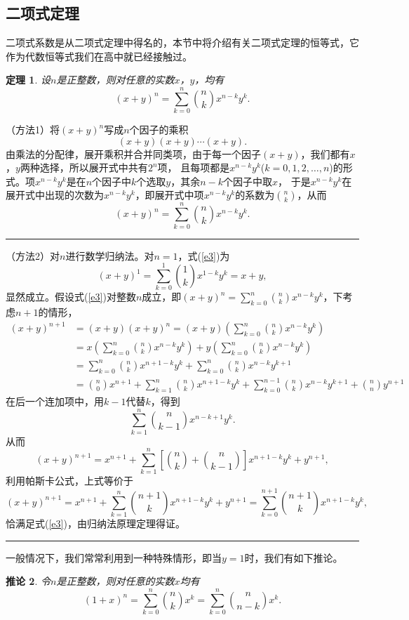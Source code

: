 \documentclass[a4paper,11pt,twoside]{book}
\newtheorem{thm}{定理}[section]
\newtheorem{coro}[thm]{推论}
\def\qed{\nopagebreak\hfill{\rule{4pt}{7pt}}\medbreak}
\begin{document}
\subsection{二项式定理}
二项式系数是从二项式定理中得名的，本节中将介绍有关二项式定理的恒等式，它作为代数恒等式我们在高中就已经接触过。
\begin{thm}
设$n$是正整数，则对任意的实数$x$，$y$，均有
\begin{equation}\label{e3}
(x+y)^n=\sum_{k=0}^n{n\choose k}x^{n-k}y^k.
\end{equation}
\end{thm}
（方法1）将$(x+y)^n$写成$n$个因子的乘积$$(x+y)(x+y)\cdots(x+y).$$
由乘法的分配律，展开乘积并合并同类项，由于每一个因子$(x+y)$，我们都有$x$，$y$两种选择，所以展开式中共有$2^n$项，
且每项都是$x^{n-k}y^k$($k=0,1,2,\ldots,n$)的形式。项$x^{n-k}y^k$是在$n$个因子中$k$个选取$y$，其余$n-k$个因子中取$x$，
于是$x^{n-k}y^k$在展开式中出现的次数为$x^{n-k}y^k$，即展开式中项$x^{n-k}y^k$的系数为${n\choose
k}$，从而
$$(x+y)^n=\sum_{k=0}^n{n\choose k}x^{n-k}y^k.$$
\qed
{}（方法2）对$n$进行数学归纳法。对$n=1$，式(\ref{e3})为$$(x+y)^1=\sum_{k=0}^1{1\choose
k}x^{1-k}y^k=x+y,$$
显然成立。假设式(\ref{e3})对整数$n$成立，即$(x+y)^n=\sum_{k=0}^n{n\choose
k}x^{n-k}y^k$，下考虑$n+1$的情形，
\begin{align*}
(x+y)^{n+1}&=(x+y)(x+y)^n=(x+y)\left(\sum_{k=0}^n{n\choose k}x^{n-k}y^k\right)\\
&=x\left(\sum_{k=0}^n{n\choose k}x^{n-k}y^k\right)+y\left(\sum_{k=0}^n{n\choose k}x^{n-k}y^k\right)\\
&=\sum_{k=0}^n{n\choose k}x^{n+1-k}y^k+\sum_{k=0}^n{n\choose k}x^{n-k}y^{k+1}\\
&={n\choose 0}x^{n+1}+\sum_{k=1}^n{n\choose
k}x^{n+1-k}y^{k}+\sum_{k=0}^{n-1}{n\choose
k}x^{n-k}y^{k+1}+{n\choose n}y^{n+1}
\end{align*}
在后一个连加项中，用$k-1$代替$k$，得到
$$\sum_{k=1}^n{n\choose k-1}x^{n-k+1}y^k.$$
从而$$(x+y)^{n+1}=x^{n+1}+\sum_{k=1}^n\left[{n\choose k}+{n\choose
k-1}\right]x^{n+1-k}y^k+y^{n+1},$$
利用帕斯卡公式，上式等价于$$(x+y)^{n+1}=x^{n+1}+\sum_{k=1}^n{n+1\choose
k}x^{n+1-k}y^k+y^{n+1}=\sum_{k=0}^{n+1}{n+1\choose
k}x^{n+1-k}y^k,$$恰满足式(\ref{e3})，由归纳法原理定理得证。 \qed

一般情况下，我们常常利用到一种特殊情形，即当$y=1$时，我们有如下推论。
\begin{coro}
令$n$是正整数，则对任意的实数$x$均有$$(1+x)^n=\sum_{k=0}^n{n\choose
k}x^k=\sum_{k=0}^n{n\choose n-k}x^k.$$
\end{coro}
\end{document}
